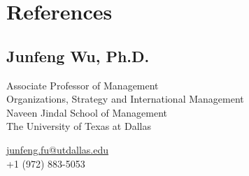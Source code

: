 \documentclass[12pt,letterpaper]{report} %
\begin{document}










    \section*{References}

    \subsection*{Junfeng Wu, Ph.D.}
        \begin{minipage}[t]{0.700\textwidth}
        Associate Professor of Management \\
        Organizations, Strategy and International Management \\
        Naveen Jindal School of Management \\
        The University of Texas at Dallas
    \end{minipage}
    \begin{minipage}[t]{0.295\textwidth}
        \flushright{}
        \href{mailto:junfeng.fu@utdallas.edu}{junfeng.fu@utdallas.edu} \\
        +1 (972) 883-5053 
    \end{minipage}
\end{document}
